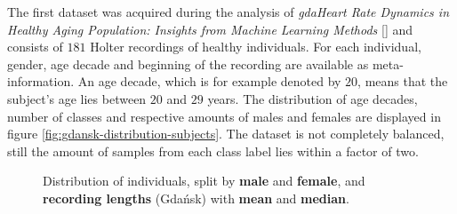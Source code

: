 \documentclass[11pt]{scrartcl}
\begin{document}
 The first dataset was acquired during the analysis of \textit{gdaHeart Rate Dynamics in Healthy Aging Population: Insights from Machine Learning Methods} [\cite{patternshrd}] and consists of $181$ Holter recordings of healthy individuals. For each individual, gender, age decade and beginning of the recording are available as meta-information. An age decade, which is for example denoted by $20$, means that the subject's age lies between $20$ and $29$ years. The distribution of age decades, number of classes and respective amounts of males and females are displayed in figure \ref{fig:gdansk-distribution-subjects}. The dataset is not completely balanced, still the amount of samples from each class label lies within a factor of two.

\begin{figure}[hbt]
	\caption{Distribution of individuals, split by \textcolor{viridis0}{\textbf{male}} and \textcolor{viridis9}{\textbf{female}}, and \textcolor{viridis5}{\textbf{recording lengths}} (Gdańsk) with \textcolor{viridis9}{\textbf{mean}} and \textcolor{viridis0}{\textbf{median}}.}
\end{figure}
\end{document}
